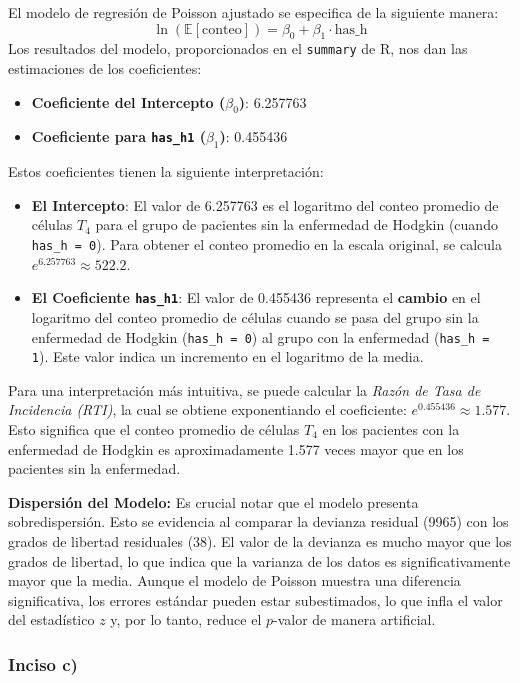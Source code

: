 \documentclass[paper=letter, fontsize=11pt, draft=false]{scrartcl}\usepackage[]{graphicx}\usepackage[]{xcolor}
\numberwithin{equation}{problemcounter} %
\numberwithin{figure}{problemcounter} %
\numberwithin{table}{problemcounter} %
\numberwithin{subsection}{problemcounter}
\begin{document}
El modelo de regresión de Poisson ajustado se especifica de la siguiente manera:
$$
\ln(\mathbb{E}[\text{conteo}]) = \beta_0 + \beta_1 \cdot \text{has\_h}
$$
Los resultados del modelo, proporcionados en el \texttt{summary} de R, nos dan las estimaciones de los coeficientes:
\begin{itemize}
    \item \textbf{Coeficiente del Intercepto ($\beta_0$)}: 6.257763
    \item \textbf{Coeficiente para \texttt{has\_h1} ($\beta_1$)}: 0.455436
\end{itemize}
Estos coeficientes tienen la siguiente interpretación:
\begin{itemize}
    \item \textbf{El Intercepto}: El valor de 6.257763 es el logaritmo del conteo promedio de células $T_4$ para el grupo de pacientes sin la enfermedad de Hodgkin (cuando \texttt{has\_h = 0}). Para obtener el conteo promedio en la escala original, se calcula $e^{6.257763} \approx 522.2$.
    \item \textbf{El Coeficiente \texttt{has\_h1}}: El valor de 0.455436 representa el \textbf{cambio} en el logaritmo del conteo promedio de células cuando se pasa del grupo sin la enfermedad de Hodgkin (\texttt{has\_h = 0}) al grupo con la enfermedad (\texttt{has\_h = 1}). Este valor indica un incremento en el logaritmo de la media.
\end{itemize}
Para una interpretación más intuitiva, se puede calcular la \textit{Razón de Tasa de Incidencia (RTI)}, la cual se obtiene exponentiando el coeficiente: $e^{0.455436} \approx 1.577$. Esto significa que el conteo promedio de células $T_4$ en los pacientes con la enfermedad de Hodgkin es aproximadamente 1.577 veces mayor que en los pacientes sin la enfermedad.

\noindent\textbf{Dispersión del Modelo:}
Es crucial notar que el modelo presenta sobredispersión. Esto se evidencia al comparar la devianza residual (9965) con los grados de libertad residuales (38). El valor de la devianza es mucho mayor que los grados de libertad, lo que indica que la varianza de los datos es significativamente mayor que la media.
Aunque el modelo de Poisson muestra una diferencia significativa, los errores estándar pueden estar subestimados, lo que infla el valor del estadístico $z$ y, por lo tanto, reduce el $p$-valor de manera artificial. 

\subsubsection*{Inciso c)}
\end{document}
